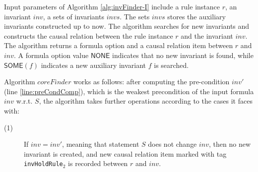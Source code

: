 \documentclass[final]{IEEEtran}
\begin{document}
{\begin{algorithm}

\end{algorithm}



Input parameters of Algorithm \ref{alg:invFinder-I} include a rule instance $r$, an invariant $inv$, a sets of invariants $invs$.  The sets $invs$   stores the auxiliary invariants constructed up to now. The algorithm   searches for new invariants and    constructs the causal relation between the rule instance $r$ and the invariant $inv$.
The algorithm returns a formula option and a causal relation item between $r$ and $inv$. A formula option value $\mathsf{NONE}$ indicates that no new invariant is found, while $\mathsf{SOME}(f)$ indicates a new auxiliary invariant $f$ is searched.


%

Algorithm $coreFinder$ works as follows: after computing the pre-condition $ inv'$ (line \ref{line:preCondComp}), which is the weakest precondition of the input formula $inv$ w.r.t. $S$, the algorithm takes further operations according to the cases it faces with:

\begin{description}
\item[(1)] If $ inv=inv'$, meaning that statement $S$ does not change $inv$, then no new invariant is created, and  new causal
relation item marked with tag {\tt invHoldRule$_2$} is recorded
between $r$ and $inv$.%


\end{description}}
\end{document}
